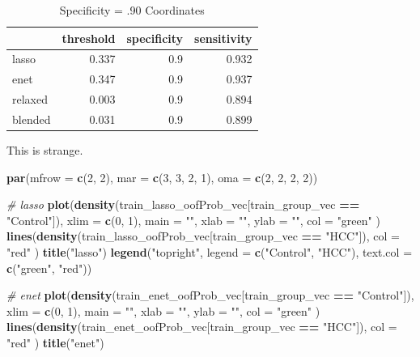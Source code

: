 \documentclass[
]{book}
\newenvironment{Shaded}{\begin{snugshade}}{\end{snugshade}}
\newcommand{\CommentTok}[1]{\textcolor[rgb]{0.56,0.35,0.01}{\textit{#1}}}
\newcommand{\DataTypeTok}[1]{\textcolor[rgb]{0.13,0.29,0.53}{#1}}
\newcommand{\DecValTok}[1]{\textcolor[rgb]{0.00,0.00,0.81}{#1}}
\newcommand{\KeywordTok}[1]{\textcolor[rgb]{0.13,0.29,0.53}{\textbf{#1}}}
\newcommand{\NormalTok}[1]{#1}
\newcommand{\OperatorTok}[1]{\textcolor[rgb]{0.81,0.36,0.00}{\textbf{#1}}}
\newcommand{\StringTok}[1]{\textcolor[rgb]{0.31,0.60,0.02}{#1}}
\begin{document}
\begin{table}

\caption{\label{tab:thresh90}Specificity = .90 Coordinates}
\centering
\begin{tabular}[t]{l|r|r|r}
\hline
  & threshold & specificity & sensitivity\\
\hline
lasso & 0.337 & 0.9 & 0.932\\
\hline
enet & 0.347 & 0.9 & 0.937\\
\hline
relaxed & 0.003 & 0.9 & 0.894\\
\hline
blended & 0.031 & 0.9 & 0.899\\
\hline
\end{tabular}
\end{table}

This is strange.

\begin{Shaded}
\begin{Highlighting}[]
\KeywordTok{par}\NormalTok{(}\DataTypeTok{mfrow =} \KeywordTok{c}\NormalTok{(}\DecValTok{2}\NormalTok{, }\DecValTok{2}\NormalTok{), }\DataTypeTok{mar =} \KeywordTok{c}\NormalTok{(}\DecValTok{3}\NormalTok{, }\DecValTok{3}\NormalTok{, }\DecValTok{2}\NormalTok{, }\DecValTok{1}\NormalTok{), }\DataTypeTok{oma =} \KeywordTok{c}\NormalTok{(}\DecValTok{2}\NormalTok{, }\DecValTok{2}\NormalTok{, }\DecValTok{2}\NormalTok{, }\DecValTok{2}\NormalTok{))}

\CommentTok{\# lasso}
\KeywordTok{plot}\NormalTok{(}\KeywordTok{density}\NormalTok{(train\_lasso\_oofProb\_vec[train\_group\_vec }\OperatorTok{==}\StringTok{ "Control"}\NormalTok{]),}
  \DataTypeTok{xlim =} \KeywordTok{c}\NormalTok{(}\DecValTok{0}\NormalTok{, }\DecValTok{1}\NormalTok{), }\DataTypeTok{main =} \StringTok{""}\NormalTok{, }\DataTypeTok{xlab =} \StringTok{""}\NormalTok{, }\DataTypeTok{ylab =} \StringTok{""}\NormalTok{, }\DataTypeTok{col =} \StringTok{"green"}
\NormalTok{)}
\KeywordTok{lines}\NormalTok{(}\KeywordTok{density}\NormalTok{(train\_lasso\_oofProb\_vec[train\_group\_vec }\OperatorTok{==}\StringTok{ "HCC"}\NormalTok{]),}
  \DataTypeTok{col =} \StringTok{"red"}
\NormalTok{)}
\KeywordTok{title}\NormalTok{(}\StringTok{"lasso"}\NormalTok{)}
\KeywordTok{legend}\NormalTok{(}\StringTok{"topright"}\NormalTok{, }\DataTypeTok{legend =} \KeywordTok{c}\NormalTok{(}\StringTok{"Control"}\NormalTok{, }\StringTok{"HCC"}\NormalTok{), }\DataTypeTok{text.col =} \KeywordTok{c}\NormalTok{(}\StringTok{"green"}\NormalTok{, }\StringTok{"red"}\NormalTok{))}

\CommentTok{\# enet}
\KeywordTok{plot}\NormalTok{(}\KeywordTok{density}\NormalTok{(train\_enet\_oofProb\_vec[train\_group\_vec }\OperatorTok{==}\StringTok{ "Control"}\NormalTok{]),}
  \DataTypeTok{xlim =} \KeywordTok{c}\NormalTok{(}\DecValTok{0}\NormalTok{, }\DecValTok{1}\NormalTok{), }\DataTypeTok{main =} \StringTok{""}\NormalTok{, }\DataTypeTok{xlab =} \StringTok{""}\NormalTok{, }\DataTypeTok{ylab =} \StringTok{""}\NormalTok{, }\DataTypeTok{col =} \StringTok{"green"}
\NormalTok{)}
\KeywordTok{lines}\NormalTok{(}\KeywordTok{density}\NormalTok{(train\_enet\_oofProb\_vec[train\_group\_vec }\OperatorTok{==}\StringTok{ "HCC"}\NormalTok{]),}
  \DataTypeTok{col =} \StringTok{"red"}
\NormalTok{)}
\KeywordTok{title}\NormalTok{(}\StringTok{"enet"}\NormalTok{)}


\end{Highlighting}
\end{Shaded}
\end{document}
